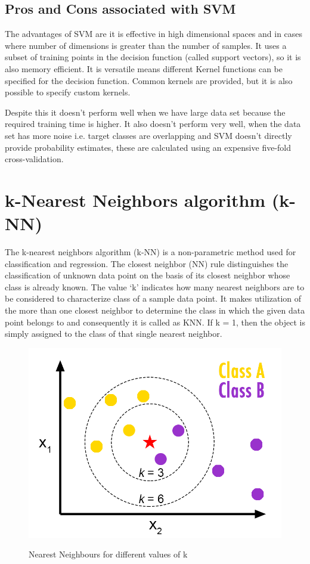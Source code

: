 \subsection{Pros and Cons associated with SVM} \label{Pros and Cons associated with SVM}

\noindent The advantages of SVM are it is effective in high dimensional spaces and in cases where number of dimensions is greater than the number of samples. It uses a subset of training points in the decision function (called support vectors), so it is also memory efficient. It is versatile means different Kernel functions can be specified for the decision function. Common kernels are provided, but it is also possible to specify custom kernels. 

\noindent Despite this it doesn’t perform well when we have large data set because the required training time is higher. It also doesn’t perform very well, when the data set has more noise i.e. target classes are overlapping and SVM doesn’t directly provide probability estimates, these are calculated using an expensive five-fold cross-validation.


\newpage

\section{k-Nearest Neighbors algorithm (k-NN)} \label{k-Nearest Neighbors algorithm (k-NN)}
\noindent The k-nearest neighbors algorithm (k-NN) is a non-parametric method used for classification and regression. The closest neighbor (NN) rule distinguishes the classification of unknown data point on the basis of its closest neighbor whose class is already known. The value ‘k’ indicates how many nearest neighbors are to be considered to characterize class of a sample data point. It makes utilization of the more than one closest neighbor to determine the class in which the given data point belongs to and consequently it is called as KNN. If k = 1, then the object is simply assigned to the class of that single nearest neighbor.


\begin{figure}[H]
\centering
{\includegraphics[scale=0.75]{knn.png}}
\caption{Nearest Neighbours for different values of k}
\end{figure}


